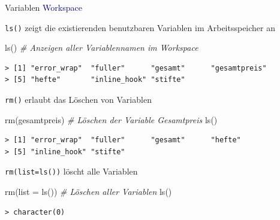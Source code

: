 \documentclass[
  8pt,
  ignorenonframetext,
]{beamer}
\newenvironment{Shaded}{\begin{snugshade}}{\end{snugshade}}
\newcommand{\AttributeTok}[1]{\textcolor[rgb]{0.77,0.63,0.00}{#1}}
\newcommand{\CommentTok}[1]{\textcolor[rgb]{0.56,0.35,0.01}{\textit{#1}}}
\newcommand{\FunctionTok}[1]{\textcolor[rgb]{0.00,0.00,0.00}{#1}}
\newcommand{\NormalTok}[1]{#1}
\begin{document}
\begin{frame}[fragile]{Variablen}
\protect\hypertarget{variablen-3}{}
\textcolor{darkblue}{Workspace} \vspace{1mm}

\footnotesize

\texttt{ls()} zeigt die existierenden benutzbaren Variablen im
Arbeitsspeicher an

\begin{Shaded}
\begin{Highlighting}[]
\FunctionTok{ls}\NormalTok{()                        }\CommentTok{\# Anzeigen aller Variablennamen im Workspace}
\end{Highlighting}
\end{Shaded}

\begin{verbatim}
> [1] "error_wrap"  "fuller"      "gesamt"      "gesamtpreis"
> [5] "hefte"       "inline_hook" "stifte"
\end{verbatim}

\vspace{2mm}

\texttt{rm()} erlaubt das Löschen von Variablen

\begin{Shaded}
\begin{Highlighting}[]
\FunctionTok{rm}\NormalTok{(gesamtpreis)             }\CommentTok{\# Löschen der Variable Gesamtpreis}
\FunctionTok{ls}\NormalTok{()}
\end{Highlighting}
\end{Shaded}

\begin{verbatim}
> [1] "error_wrap"  "fuller"      "gesamt"      "hefte"      
> [5] "inline_hook" "stifte"
\end{verbatim}

\vspace{2mm}

\texttt{rm(list=ls())} löscht alle Variablen

\begin{Shaded}
\begin{Highlighting}[]
\FunctionTok{rm}\NormalTok{(}\AttributeTok{list =} \FunctionTok{ls}\NormalTok{())             }\CommentTok{\# Löschen aller Variablen}
\FunctionTok{ls}\NormalTok{()}
\end{Highlighting}
\end{Shaded}

\begin{verbatim}
> character(0)
\end{verbatim}
\end{frame}
\end{document}
